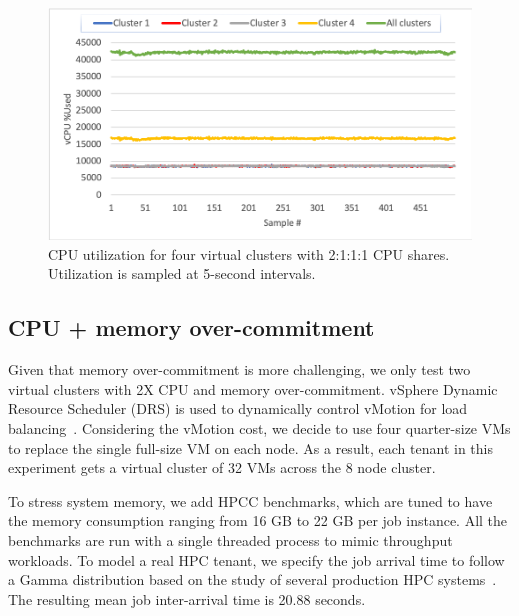 \begin{figure}[!t]
   \begin{center}
       \includegraphics[width=\columnwidth]{Figures/share_utilization}
   \end{center}
   \caption{CPU utilization for four virtual clusters with 2:1:1:1 CPU shares. Utilization is sampled at 5-second intervals.}
   \label{fig:share_utilization}
 \end{figure}

\subsection{CPU + memory over-commitment}
Given that memory over-commitment is more challenging, we only test two virtual clusters with 2X CPU and memory over-commitment. vSphere Dynamic Resource Scheduler (DRS) is used to dynamically control vMotion for load balancing~\cite{infrastructure2006resource}. Considering the vMotion cost, we decide to use four quarter-size VMs to replace the single full-size VM on each node. As a result, each tenant in this experiment gets a virtual cluster of 32 VMs across the 8 node cluster. 

To stress system memory, we add HPCC benchmarks, which are tuned to have the memory consumption ranging from 16 GB to 22 GB per job instance. All the benchmarks are run with a single threaded process to mimic throughput workloads. 
To model a real HPC tenant, we specify the job arrival time to follow a Gamma distribution based on the study of several production HPC systems~\cite{lublin2003workload}.  
The resulting mean job inter-arrival time is 20.88 seconds.

